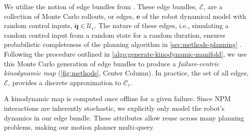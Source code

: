 We utilize the notion of edge bundles from \cite{shome2021asymptotically}. These edge bundles, $\mathcal{E}$, are a collection of Monte Carlo rollouts, or edges, $\mathbf{e}$ of the robot dynamical model with random control inputs, $\mathbf{\Dot{q}} \in \mathcal{U}_c$.
The nature of these edges, i.e., simulating a random control input from a random state for a random duration, ensures probabilistic completeness of the planning algorithm in \cref{sec:methods-planning} \cite{kleinbort2018probabilistic}. 
Following the procedure outlined in \cref{algo:generate-kinodynamic-manifold}, we use this Monte Carlo generation of edge bundles to produce a \textsl{failure-centric kinodynamic map} (\cref{fig:methods}, Center Column).
In practice, the set of all edges, $\mathcal{E}$, provides a discrete approximation to $\mathcal{C}_c$.



A kinodynamic map is computed once offline for a given failure. Since NPM interactions are inherently stochastic, we explicitly only model the robot's dynamics in our edge bundle. These attributes allow reuse across many planning problems, making our motion planner multi-query. 


